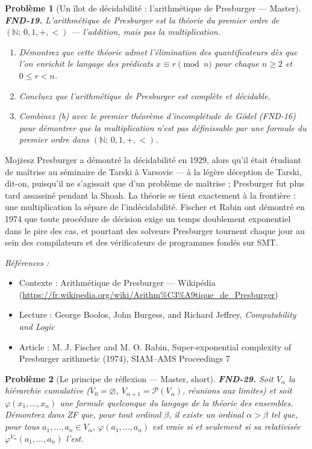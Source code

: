 \documentclass[11pt]{article}
\newtheorem{problem}{Problème}
\newenvironment{refs}{\par\small\noindent\emph{Références :}\begin{itemize}\setlength\itemsep{0pt}}{\end{itemize}\normalsize}
\begin{document}
\bigskip

\begin{problem}[{Un îlot de décidabilité : l'arithmétique de Presburger --- Master}]
\textbf{FND-19.} L'arithmétique de Presburger est la théorie du premier ordre de
$ (\mathbb{N};\, 0, 1, +, <) $ --- l'addition, mais pas la multiplication.
\begin{enumerate}
\item[(a)] Démontrez que cette
théorie admet l'élimination des quantificateurs dès que l'on enrichit le langage des prédicats
$ x \equiv r \pmod{n} $ pour chaque $ n \ge 2 $ et $ 0 \le r < n $.
\item[(b)] Concluez que
l'arithmétique de Presburger est complète et décidable.
\item[(c)] Combinez (b) avec le premier
théorème d'incomplétude de Gödel (FND-16) pour démontrer que la multiplication n'est pas
définissable par une formule du premier ordre dans $ (\mathbb{N};\, 0, 1, +, <) $.
\end{enumerate}

\end{problem}

\noindent Moj\.zesz Presburger a démontré la décidabilité en 1929, alors qu'il était
étudiant de maîtrise au séminaire de Tarski à Varsovie --- à la légère déception de Tarski,
dit-on, puisqu'il ne s'agissait \og{} que \fg{} d'un problème de maîtrise ; Presburger fut plus tard
assassiné pendant la Shoah. La théorie se tient exactement à la frontière : une multiplication
la sépare de l'indécidabilité. Fischer et Rabin ont démontré en 1974 que toute procédure de
décision exige un temps doublement exponentiel dans le pire des cas, et pourtant des solveurs
Presburger tournent chaque jour au sein des compilateurs et des vérificateurs de programmes
fondés sur SMT.

\begin{refs}
\item Contexte : Arithmétique de Presburger --- Wikipédia (\url{https://fr.wikipedia.org/wiki/Arithm%C3%A9tique_de_Presburger})
\item Lecture : George Boolos, John Burgess, and Richard Jeffrey, \textit{Computability and Logic}
\item Article : M. J. Fischer and M. O. Rabin, \og{} Super-exponential complexity of Presburger arithmetic \fg{} (1974), SIAM--AMS Proceedings 7
\end{refs}

\bigskip

\begin{problem}[{Le principe de réflexion --- Master, short}]
\textbf{FND-29.} Soit $ V_\alpha $ la hiérarchie cumulative
($ V_0 = \varnothing $, $ V_{\alpha+1} = \mathcal{P}(V_\alpha) $, réunions aux limites) et soit
$ \varphi(x_1, \ldots, x_n) $ une formule quelconque du langage de la théorie des ensembles.
Démontrez dans ZF que, pour tout ordinal $ \beta $, il existe un ordinal $ \alpha > \beta $ tel
que, pour tous $ a_1, \ldots, a_n \in V_\alpha $, $ \varphi(a_1, \ldots, a_n) $ est vraie si et
seulement si sa relativisée $ \varphi^{V_\alpha}(a_1, \ldots, a_n) $ l'est.
\end{problem}
\end{document}
